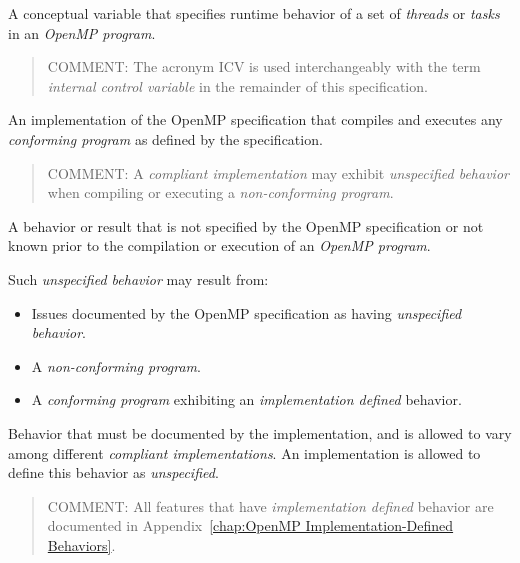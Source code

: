 \glossarydefstart
A conceptual variable that specifies runtime behavior of a set of \emph{threads} or \emph{tasks} 
in an \emph{OpenMP program}.

\begin{quote}
COMMENT: The acronym ICV is used interchangeably with the term \emph{internal 
control variable} in the remainder of this specification.
\end{quote}
\glossarydefend

\glossarydefstart
An implementation of the OpenMP specification that compiles and executes any 
\emph{conforming program} as defined by the specification.

\begin{quote}
COMMENT: A \emph{compliant implementation} may exhibit \emph{unspecified behavior} when 
compiling or executing a \emph{non-conforming program}.
\end{quote}
\glossarydefend

\glossarydefstart
A behavior or result that is not specified by the OpenMP specification or not 
known prior to the compilation or execution of an \emph{OpenMP program}.

Such \emph{unspecified behavior} may result from:

\begin{itemize}
\item Issues documented by the OpenMP specification as having \emph{unspecified 
behavior}.

\item A \emph{non-conforming program}.

\item A \emph{conforming program} exhibiting an \emph{implementation defined} behavior.
\end{itemize}
\glossarydefend

\glossarydefstart
Behavior that must be documented by the implementation, and is allowed to vary 
among different \emph{compliant implementations}. An implementation is allowed to 
define this behavior as \emph{unspecified}.

\begin{quote}
COMMENT: All features that have \emph{implementation defined} behavior 
are documented in Appendix~\ref{chap:OpenMP Implementation-Defined Behaviors}.
\end{quote}
\glossarydefend

